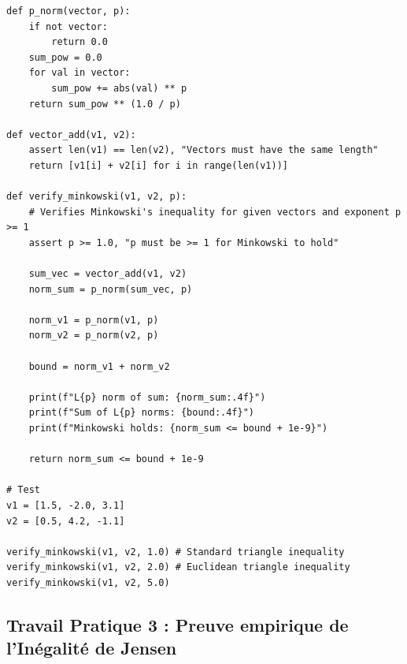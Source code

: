 \documentclass[11pt,a4paper]{article}
\begin{document}
\begin{lstlisting}
def p_norm(vector, p):
    if not vector:
        return 0.0
    sum_pow = 0.0
    for val in vector:
        sum_pow += abs(val) ** p
    return sum_pow ** (1.0 / p)

def vector_add(v1, v2):
    assert len(v1) == len(v2), "Vectors must have the same length"
    return [v1[i] + v2[i] for i in range(len(v1))]

def verify_minkowski(v1, v2, p):
    # Verifies Minkowski's inequality for given vectors and exponent p >= 1
    assert p >= 1.0, "p must be >= 1 for Minkowski to hold"

    sum_vec = vector_add(v1, v2)
    norm_sum = p_norm(sum_vec, p)

    norm_v1 = p_norm(v1, p)
    norm_v2 = p_norm(v2, p)

    bound = norm_v1 + norm_v2

    print(f"L{p} norm of sum: {norm_sum:.4f}")
    print(f"Sum of L{p} norms: {bound:.4f}")
    print(f"Minkowski holds: {norm_sum <= bound + 1e-9}")

    return norm_sum <= bound + 1e-9

# Test
v1 = [1.5, -2.0, 3.1]
v2 = [0.5, 4.2, -1.1]

verify_minkowski(v1, v2, 1.0) # Standard triangle inequality
verify_minkowski(v1, v2, 2.0) # Euclidean triangle inequality
verify_minkowski(v1, v2, 5.0)
\end{lstlisting}


\subsection*{Travail Pratique 3 : Preuve empirique de l'Inégalité de Jensen}
\end{document}
